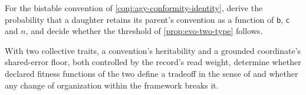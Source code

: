 \begin{openproblem}\label{open:evo-threshold}
For the bistable convention of \cref{conj:agy-conformity-identity}, derive the probability that a daughter retains its parent's convention as a function of $\mathsf b$, $\mathsf c$ and $n$, and decide whether the threshold of \cref{prop:evo-two-type} follows.
\end{openproblem}

\begin{openproblem}\label{open:evo-tradeoff}
With two collective traits, a convention's heritability and a grounded coordinate's shared-error floor, both controlled by the record's read weight, determine whether declared fitness functions of the two define a tradeoff in the sense of \citet{bourrat2022tradeoff} and whether any change of organization within the framework breaks it.
\end{openproblem}

